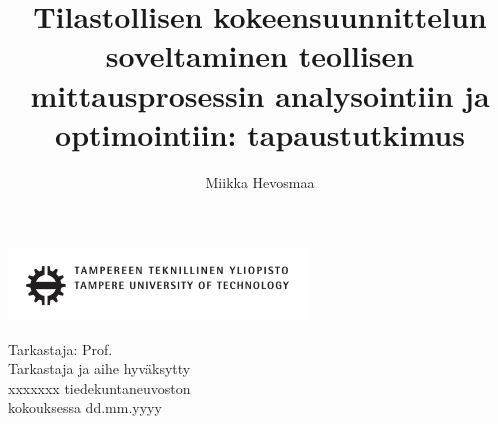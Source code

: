 \documentclass[12pt,a4paper,finnish]{tutthesis}
\author{Miikka Hevosmaa}
\title{Tilastollisen kokeensuunnittelun soveltaminen teollisen mittausprosessin analysointiin ja optimointiin: tapaustutkimus}      %
\begin{document}
\thispagestyle{empty}
\vspace*{-1cm}\noindent
\includegraphics[width=8cm]{tty_tut_logo}   %



\vspace{6.8cm}
\maketitle
\vspace{6.cm} %

\begin{flushright}  
  \begin{minipage}[c]{6.8cm}
    \begin{spacing}{1.0}
      \textsf{Tarkastaja: Prof. \@examiner}\\
      \textsf{Tarkastaja ja aihe hyväksytty}\\ 
      \textsf{xxxxxxx tiedekuntaneuvoston}\\
      \textsf{kokouksessa dd.mm.yyyy}\\
    \end{spacing}
  \end{minipage}
\end{flushright}

\if@twoside
\clearpage
\fi
\end{document}
